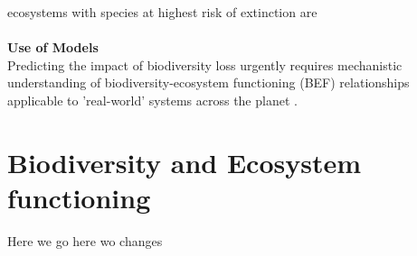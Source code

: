 ecosystems with species at highest risk of extinction are 
 \\\\
%
%
\textbf{Use of Models}\\
Predicting the impact of biodiversity loss urgently requires mechanistic understanding of biodiversity-ecosystem functioning (BEF) relationships applicable to 'real-world' systems across the planet \citep{Dobson2006,Estes2011}. 
%

\section{Biodiversity and Ecosystem functioning}
\label{chap:intro:biodiv}
Here we go  here wo changes